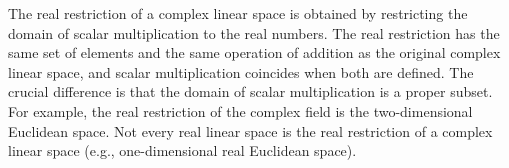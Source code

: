 The real restriction of a complex linear space is obtained by restricting the domain of scalar multiplication to the real numbers. The real restriction has the same set of elements and the same operation of addition as the original complex linear space, and scalar multiplication coincides when both are defined. The crucial difference is that the domain of scalar multiplication is a proper subset. For example, the real restriction of the complex field is the two-dimensional Euclidean space. Not every real linear space is the real restriction of a complex linear space (e.g., one-dimensional real Euclidean space).
